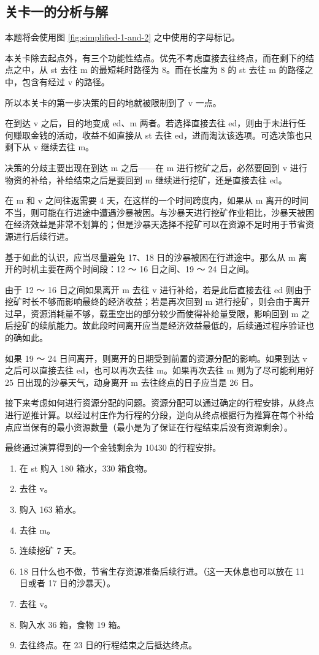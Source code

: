 \documentclass[a4paper]{ctexart}
\begin{document}
\subsection{关卡一的分析与解}

本题将会使用图 \ref{fig:simplified-1-and-2} 之中使用的字母标记。

本关卡除去起点外，有三个功能性结点。优先不考虑直接去往终点，而在剩下的结点之中，从 st 去往 m 的最短耗时路径为 8。而在长度为 8 的 st 去往 m 的路径之中，包含有经过 v 的路径。

所以本关卡的第一步决策的目的地就被限制到了 v 一点。

在到达 v 之后，目的地变成 ed、m 两者。若选择直接去往 ed，则由于未进行任何赚取金钱的活动，收益不如直接从 st 去往 ed，进而淘汰该选项。可选决策也只剩下从 v 继续去往 m。

决策的分歧主要出现在到达 m 之后——在 m 进行挖矿之后，必然要回到 v 进行物资的补给，补给结束之后是要回到 m 继续进行挖矿，还是直接去往 ed。

在 m 和 v 之间往返需要 4 天，在这样的一个时间跨度内，如果从 m 离开的时间不当，则可能在行进途中遭遇沙暴被困。与沙暴天进行挖矿作业相比，沙暴天被困在经济效益是非常不划算的；但是沙暴天选择不挖矿可以在资源不足时用于节省资源进行后续行进。

基于如此的认识，应当尽量避免 17、18 日的沙暴被困在行进途中。那么从 m 离开的时机主要在两个时间段：12 ～ 16 日之间、19 ～ 24 日之间。

由于 12 ～ 16 日之间如果离开 m 去往 v 进行补给，若是此后直接去往 ed 则由于挖矿时长不够而影响最终的经济收益；若是再次回到 m 进行挖矿，则会由于离开过早，资源消耗量不够，载重空出的部分较少而使得补给量受限，影响回到 m 之后挖矿的续航能力。故此段时间离开应当是经济效益最低的，后续通过程序验证也的确如此。

如果 19 ～ 24 日间离开，则离开的日期受到前置的资源分配的影响。如果到达 v 之后可以直接去往 ed，也可以再次去往 m。如果再次去往 m 则为了尽可能利用好 25 日出现的沙暴天气，动身离开 m 去往终点的日子应当是 26 日。

接下来考虑如何进行资源分配的问题。资源分配可以通过确定的行程安排，从终点进行逆推计算。以经过村庄作为行程的分段，逆向从终点根据行为推算在每个补给点应当保有的最小资源数量（最小是为了保证在行程结束后没有资源剩余）。

最终通过演算得到的一个金钱剩余为 10430 的行程安排。

\begin{enumerate}
    \item 在 st 购入 180 箱水，330 箱食物。
    \item 去往 v。
    \item 购入 163 箱水。
    \item 去往 m。
    \item 连续挖矿 7 天。
    \item 18 日什么也不做，节省生存资源准备后续行进。（这一天休息也可以放在 11 日或者 17 日的沙暴天）。
    \item 去往 v。
    \item 购入水 36 箱，食物 19 箱。
    \item 去往终点。在 23 日的行程结束之后抵达终点。
\end{enumerate}
\end{document}
